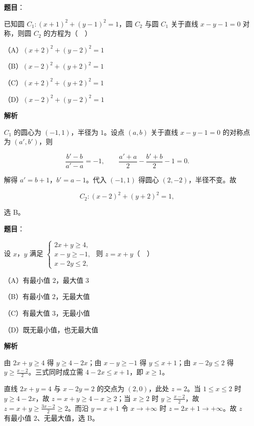 \begin{answer}

\textbf{题目}：

已知圆 $C_1:(x+1)^2+(y-1)^2=1$，圆 $C_2$ 与圆 $C_1$ 关于直线 $x-y-1=0$ 对称，则圆 $C_2$ 的方程为（　）

（A）$(x+2)^2+(y-2)^2=1$

（B）$(x-2)^2+(y+2)^2=1$

（C）$(x+2)^2+(y+2)^2=1$

（D）$(x-2)^2+(y-2)^2=1$

\textbf{解析}

$C_1$ 的圆心为 $(-1,1)$，半径为 $1$。设点 $(a,b)$ 关于直线 $x-y-1=0$ 的对称点为 $(a',b')$，则

\nopagebreak[4]
\[\frac{b'-b}{a'-a}=-1,\qquad \frac{a'+a}{2}-\frac{b'+b}{2}-1=0 .\]

解得 $a'=b+1$，$b'=a-1$。代入 $(-1,1)$ 得圆心 $(2,-2)$，半径不变。故

\nopagebreak[4]
\[C_2:(x-2)^2+(y+2)^2=1,\]

选 B。


\end{answer}
\begin{answer}

\textbf{题目}：

设 $x$，$y$ 满足 $\begin{cases}2x+y\geqslant4,\\ x-y\geqslant-1,\\ x-2y\leqslant2,\end{cases}$ 则 $z=x+y$（　）

（A）有最小值 $2$，最大值 $3$

（B）有最小值 $2$，无最大值

（C）有最大值 $3$，无最小值

（D）既无最小值，也无最大值

\textbf{解析}

由 $2x+y\geqslant4$ 得 $y\geqslant4-2x$；由 $x-y\geqslant-1$ 得 $y\leqslant x+1$；由 $x-2y\leqslant2$ 得 $y\geqslant\frac{x-2}{2}$。三式同时成立需 $4-2x\leqslant x+1$，即 $x\geqslant1$。

直线 $2x+y=4$ 与 $x-2y=2$ 的交点为 $(2,0)$，此处 $z=2$。当 $1\leqslant x\leqslant2$ 时 $y\geqslant4-2x$，故 $z=x+y\geqslant4-x\geqslant2$；当 $x\geqslant2$ 时 $y\geqslant\frac{x-2}{2}$，故 $z=x+y\geqslant\frac{3x-2}{2}\geqslant2$。而沿 $y=x+1$ 令 $x\to+\infty$ 时 $z=2x+1\to+\infty$。故 $z$ 有最小值 $2$、无最大值，选 B。


\end{answer}
